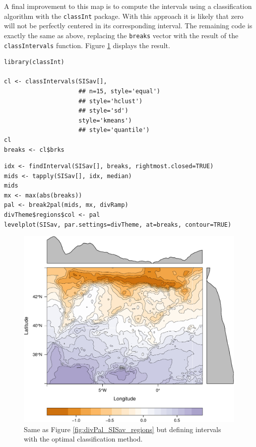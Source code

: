 \documentclass[smallroyalvopaper]{memoir}
\begin{document}
A final improvement to this map is to compute the intervals using a
classification algorithm with the \texttt{classInt} package. With this
approach it is likely that zero will not be perfectly centered in its
corresponding interval. The remaining code is exactly the same as
above, replacing the \texttt{breaks} vector with the result of the
\texttt{classIntervals} function. Figure \ref{fig:divPalSISav_classInt}
displays the result.


\lstset{language=R,numbers=none}
\begin{lstlisting}
library(classInt)

cl <- classIntervals(SISav[],
                     ## n=15, style='equal')
                     ## style='hclust')
                     ## style='sd')
                     style='kmeans')
                     ## style='quantile')
cl
breaks <- cl$brks
\end{lstlisting}

\lstset{language=R,numbers=none}
\begin{lstlisting}
idx <- findInterval(SISav[], breaks, rightmost.closed=TRUE)
mids <- tapply(SISav[], idx, median)
mids
mx <- max(abs(breaks))
pal <- break2pal(mids, mx, divRamp)
divTheme$regions$col <- pal
levelplot(SISav, par.settings=divTheme, at=breaks, contour=TRUE)
\end{lstlisting}

\begin{figure}[htb]
\centering
\includegraphics[width=.9\linewidth]{figs/divPalSISav_classInt.pdf}
\caption{\label{fig:divPalSISav_classInt}Same as Figure \ref{fig:divPal_SISav_regions} but defining intervals with the optimal classification method.}
\end{figure}
\end{document}
